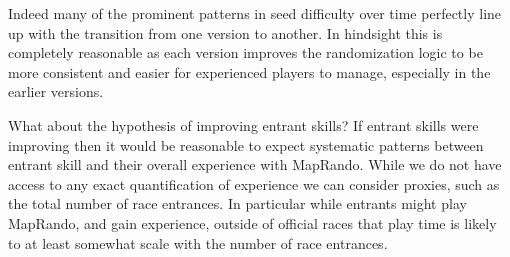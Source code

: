 \documentclass[
  letterpaper,
  DIV=11,
  numbers=noendperiod]{scrartcl}
\newenvironment{Shaded}{\begin{snugshade}}{\end{snugshade}}
\newcommand{\AttributeTok}[1]{\textcolor[rgb]{0.40,0.45,0.13}{#1}}
\newcommand{\ControlFlowTok}[1]{\textcolor[rgb]{0.00,0.23,0.31}{#1}}
\newcommand{\DecValTok}[1]{\textcolor[rgb]{0.68,0.00,0.00}{#1}}
\newcommand{\FunctionTok}[1]{\textcolor[rgb]{0.28,0.35,0.67}{#1}}
\newcommand{\NormalTok}[1]{\textcolor[rgb]{0.00,0.23,0.31}{#1}}
\newcommand{\OtherTok}[1]{\textcolor[rgb]{0.00,0.23,0.31}{#1}}
\newcommand{\SpecialCharTok}[1]{\textcolor[rgb]{0.37,0.37,0.37}{#1}}
\newcommand{\StringTok}[1]{\textcolor[rgb]{0.13,0.47,0.30}{#1}}
\begin{document}
Indeed many of the prominent patterns in seed difficulty over time
perfectly line up with the transition from one version to another. In
hindsight this is completely reasonable as each version improves the
randomization logic to be more consistent and easier for experienced
players to manage, especially in the earlier versions.

What about the hypothesis of improving entrant skills? If entrant skills
were improving then it would be reasonable to expect systematic patterns
between entrant skill and their overall experience with MapRando. While
we do not have access to any exact quantification of experience we can
consider proxies, such as the total number of race entrances. In
particular while entrants might play MapRando, and gain experience,
outside of official races that play time is likely to at least somewhat
scale with the number of race entrances.

\begin{Shaded}
\end{Shaded}
\end{document}
